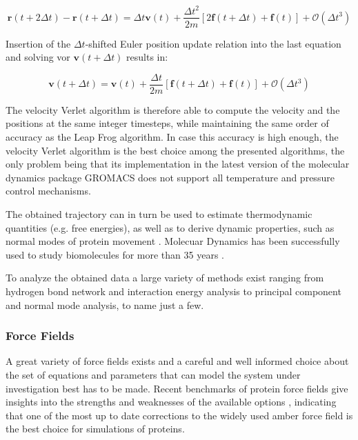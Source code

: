 \documentclass[english, a4paper, 12pt, titlepage, draft]{article}
\newcommand{\vect}[1]{\mathbf{#1}}
\newcommand{\vfun}[2]{\vect{#1}\left(#2\right)}
\begin{document}
\begin{equation}
    \vfun{r}{t+2\Delta t} - \vfun{r}{t+\Delta t} = \Delta t \vfun{v}{t} + \frac{\Delta t^2}{2m} \left[ 2\vfun{f}{t+\Delta t} + \vfun{f}{t} \right] + \mathcal{O}(\Delta t^3)
\end{equation}

Insertion of the $\Delta t$-shifted Euler position update relation into the last equation and solving vor $\vfun{v}{t+\Delta t}$ results in:

\begin{equation}
    \vfun{v}{t+\Delta t} = \vfun{v}{t} + \frac{\Delta t}{2m} \left[ \vfun{f}{t+\Delta t} + \vfun{f}{t}\right]  + \mathcal{O}(\Delta t^3)
\end{equation}

The velocity Verlet algorithm is therefore able to compute the velocity and the positions at the same integer timesteps, while maintaining the same order of accuracy as the Leap Frog algorithm.
In case this accuracy is high enough, the velocity Verlet algorithm is the best choice among the presented algorithms, the only problem being that its implementation in the latest version of the molecular dynamics package GROMACS does not support all temperature and pressure control mechanisms.

\vspace{1cm}

The obtained trajectory can in turn be used to estimate thermodynamic quantities (e.g. free energies), as well as to derive dynamic properties, such as normal modes of protein movement \cite{normalModes}.
Molecuar Dynamics has been successfully used to study biomolecules for more than 35 years \cite{MDbiomolecules}.


To analyze the obtained data a large variety of methods exist ranging from hydrogen bond network and interaction energy analysis to principal component and normal mode analysis, to name just a few.
 
 
\subsubsection{Force Fields}
\label{sec:forcefields}

A great variety of force fields exists and a careful and well informed choice about the set of equations and parameters that can model the system under investigation best has to be made.
Recent benchmarks of protein force fields give insights into the strengths and weaknesses of the available options \cite{proteinFF}, indicating that one of the most up to date corrections to the widely used amber force field \cite{amber99sb-ildn-nmr} is the best choice for simulations of proteins.
 
\end{document}

